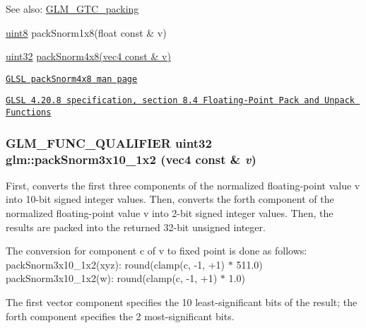 \begin{Desc}
\item[See also:]\hyperlink{group__gtc__packing}{GLM\_\-GTC\_\-packing} 

\hyperlink{group__gtc__type__precision_g1a7dcd8aac97cc8020817c94049deff2}{uint8} packSnorm1x8(float const \& v) 

\hyperlink{group__gtc__type__precision_g202b6a53c105fcb7e531f9b443518451}{uint32} \hyperlink{group__core__func__packing_gfcf25acc0d361c6c696a433aa5dfd16b}{packSnorm4x8(vec4 const \& v)} 

\href{http://www.opengl.org/sdk/docs/manglsl/xhtml/packSnorm4x8.xml}{\tt GLSL packSnorm4x8 man page} 

\href{http://www.opengl.org/registry/doc/GLSLangSpec.4.20.8.pdf}{\tt GLSL 4.20.8 specification, section 8.4 Floating-Point Pack and Unpack Functions} \end{Desc}
\hypertarget{group__gtc__packing_g0d4157cec37c0312216a7be1cc92df54}{
\subsubsection[packSnorm3x10\_\-1x2]{\setlength{\rightskip}{0pt plus 5cm}GLM\_\-FUNC\_\-QUALIFIER uint32 glm::packSnorm3x10\_\-1x2 (vec4 const \& {\em v})}}
\label{group__gtc__packing_g0d4157cec37c0312216a7be1cc92df54}


First, converts the first three components of the normalized floating-point value v into 10-bit signed integer values. Then, converts the forth component of the normalized floating-point value v into 2-bit signed integer values. Then, the results are packed into the returned 32-bit unsigned integer.

The conversion for component c of v to fixed point is done as follows: packSnorm3x10\_\-1x2(xyz): round(clamp(c, -1, +1) $\ast$ 511.0) packSnorm3x10\_\-1x2(w): round(clamp(c, -1, +1) $\ast$ 1.0)

The first vector component specifies the 10 least-significant bits of the result; the forth component specifies the 2 most-significant bits.

